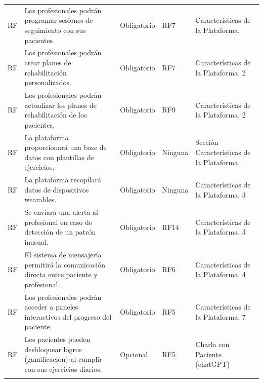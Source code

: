\documentclass{article}
\begin{document}
\begin{longtable}{@{} p{1.5cm} p{5cm} p{3cm} p{2cm} p{3cm} @{}}
	\addlinespace \stepcounter{requisitosFuncionales}
	RF\therequisitosFuncionales & Los profesionales podrán programar sesiones de seguimiento con sus pacientes. & Obligatorio & RF7 & Características de la Plataforma,  \\ 
	\addlinespace \stepcounter{requisitosFuncionales}
	RF\therequisitosFuncionales & Los profesionales podrán crear planes de rehabilitación personalizados. & Obligatorio & RF7 & Características de la Plataforma, 2  \\ 
	\addlinespace \stepcounter{requisitosFuncionales}
	RF\therequisitosFuncionales & Los profesionales podrán actualizar los planes de rehabilitación de los pacientes. & Obligatorio & RF9 & Características de la Plataforma, 2 \\ 
	\addlinespace \stepcounter{requisitosFuncionales}
	RF\therequisitosFuncionales & La plataforma proporcionará una base de datos con plantillas de ejercicios. & Obligatorio & Ninguna & Sección Características de la Plataforma,  \\ 

	\addlinespace \stepcounter{requisitosFuncionales}
	RF\therequisitosFuncionales & La plataforma recopilará datos de dispositivos wearables. & Obligatorio & Ninguna & Características de la Plataforma, 3 \\
	\addlinespace \stepcounter{requisitosFuncionales}
	RF\therequisitosFuncionales & Se enviará una alerta al profesional en caso de detección de un patrón inusual. & Obligatorio & RF14 & Características de la Plataforma, 3 \\
	\addlinespace \stepcounter{requisitosFuncionales}
	RF\therequisitosFuncionales & El sistema de mensajería permitirá la comunicación directa entre paciente y profesional. & Obligatorio & RF6 & Características de la Plataforma, 4 \\
	\addlinespace \stepcounter{requisitosFuncionales}
	
	RF\therequisitosFuncionales & Los profesionales podrán acceder a paneles interactivos del progreso del paciente. & Obligatorio & RF5 & Características de la Plataforma, 7  \\
	\addlinespace
	\stepcounter{requisitosFuncionales}RF\therequisitosFuncionales & Los pacientes pueden desbloquear logros (gamificación) al cumplir con sus ejercicios diarios. & Opcional & RF5 & Charla con Paciente (chatGPT) \\
	\addlinespace
	\bottomrule
\end{longtable}
\end{document}
